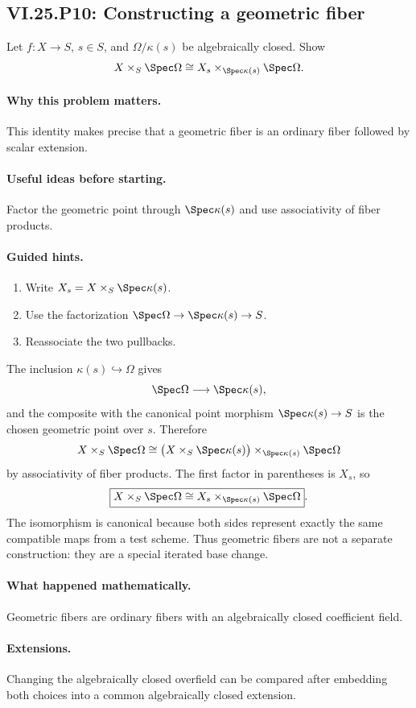 \subsection*{VI.25.P10: Constructing a geometric fiber}
\begin{problem}\label{prob:vi25-p10}
Let \(f:X\to S\), \(s\in S\), and \(\Omega/\kappa(s)\) be algebraically closed. Show
\[
X\times_S\Spec\Omega\cong X_s\times_{\Spec\kappa(s)}\Spec\Omega.
\]
\end{problem}

\ifdefined\FullProblemDossiers
\paragraph{Why this problem matters.}
This identity makes precise that a geometric fiber is an ordinary fiber followed by scalar extension.

\paragraph{Useful ideas before starting.}
Factor the geometric point through \(\Spec\kappa(s)\) and use associativity of fiber products.

\paragraph{Guided hints.}
\begin{enumerate}
\item Write \(X_s=X\times_S\Spec\kappa(s)\).
\item Use the factorization \(\Spec\Omega\to\Spec\kappa(s)\to S\).
\item Reassociate the two pullbacks.
\end{enumerate}

\begin{solution}
The inclusion \(\kappa(s)\hookrightarrow\Omega\) gives
\[
\Spec\Omega\longrightarrow\Spec\kappa(s),
\]
and the composite with the canonical point morphism \(\Spec\kappa(s)\to S\) is the chosen geometric point over \(s\).  Therefore
\[
X\times_S\Spec\Omega
\cong
\bigl(X\times_S\Spec\kappa(s)\bigr)
\times_{\Spec\kappa(s)}
\Spec\Omega
\]
by associativity of fiber products.  The first factor in parentheses is \(X_s\), so
\[
\boxed{
X\times_S\Spec\Omega
\cong
X_s\times_{\Spec\kappa(s)}\Spec\Omega
}.
\]
The isomorphism is canonical because both sides represent exactly the same compatible maps from a test scheme.  Thus geometric fibers are not a separate construction: they are a special iterated base change.
\end{solution}

\paragraph{What happened mathematically.}
Geometric fibers are ordinary fibers with an algebraically closed coefficient field.

\paragraph{Extensions.}
Changing the algebraically closed overfield can be compared after embedding both choices into a common algebraically closed extension.
\fi
